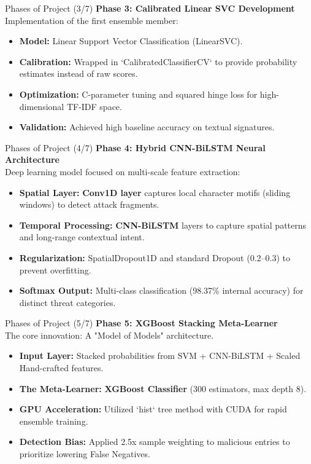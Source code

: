 \documentclass[aspectratio=169,xcolor=dvipsnames]{beamer}
\begin{document}
\begin{frame}{Phases of Project (3/7)}
\textbf{Phase 3: Calibrated Linear SVC Development} \\[0.2cm]
Implementation of the first ensemble member:
\begin{itemize}
    \item \textbf{Model:} Linear Support Vector Classification (LinearSVC).
    \item \textbf{Calibration:} Wrapped in `CalibratedClassifierCV` to provide probability estimates instead of raw scores.
    \item \textbf{Optimization:} C-parameter tuning and squared hinge loss for high-dimensional TF-IDF space.
    \item \textbf{Validation:} Achieved high baseline accuracy on textual signatures.
\end{itemize}


\end{frame}

\begin{frame}{Phases of Project (4/7)}
\textbf{Phase 4: Hybrid CNN-BiLSTM Neural Architecture} \\[0.2cm]
Deep learning model focused on multi-scale feature extraction:
\begin{itemize}
    \item \textbf{Spatial Layer:} \textbf{Conv1D layer} captures local character motifs (sliding windows) to detect attack fragments.
    \item \textbf{Temporal Processing:} \textbf{CNN-BiLSTM} layers to capture spatial patterns and long-range contextual intent.
    \item \textbf{Regularization:} SpatialDropout1D and standard Dropout (0.2--0.3) to prevent overfitting.
    \item \textbf{Softmax Output:} Multi-class classification (98.37\% internal accuracy) for distinct threat categories.
\end{itemize}

\end{frame}

\begin{frame}{Phases of Project (5/7)}
\textbf{Phase 5: XGBoost Stacking Meta-Learner} \\[0.2cm]
The core innovation: A "Model of Models" architecture.
\begin{itemize}
    \item \textbf{Input Layer:} Stacked probabilities from SVM + CNN-BiLSTM + Scaled Hand-crafted features.
    \item \textbf{The Meta-Learner:} \textbf{XGBoost Classifier} (300 estimators, max depth 8).
    \item \textbf{GPU Acceleration:} Utilized `hist` tree method with CUDA for rapid ensemble training.
    \item \textbf{Detection Bias:} Applied 2.5x sample weighting to malicious entries to prioritize lowering False Negatives.
\end{itemize}


\end{frame}
\end{document}
